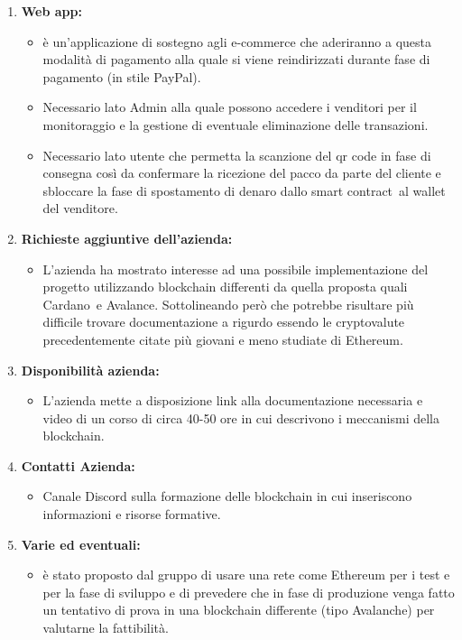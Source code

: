 \begin{enumerate}
	\item \textbf{Web app:}
	\begin{itemize}
		\item è un'applicazione di sostegno agli e-commerce che aderiranno a questa modalità di pagamento alla quale si viene reindirizzati durante fase di pagamento (in stile PayPal).
		\item Necessario lato Admin alla quale possono accedere i venditori per il monitoraggio e la gestione di eventuale eliminazione delle transazioni. 
		\item Necessario lato utente che permetta la scanzione del qr code in fase di consegna così da confermare la ricezione del pacco da parte del cliente e sbloccare la fase di spostamento di denaro dallo smart contract\glo\ al wallet del venditore.
	\end{itemize}

	\item \textbf{Richieste aggiuntive dell'azienda:}
	\begin{itemize}
		\item L'azienda ha mostrato interesse ad una possibile implementazione del progetto utilizzando blockchain\glo{} differenti da quella proposta quali Cardano\glo\ e Avalance\glo.
		 Sottolineando però che potrebbe risultare più difficile trovare documentazione a rigurdo essendo le cryptovalute precedentemente citate più giovani e meno studiate di Ethereum\glo.
	\end{itemize}

	\item \textbf{Disponibilità azienda:}
	\begin{itemize}
		\item L'azienda mette a disposizione link alla documentazione necessaria e video di un corso di circa 40-50 ore in cui descrivono i meccanismi della blockchain\glo{}.
		
	\end{itemize}

	\item \textbf{Contatti Azienda:}
	\begin{itemize}
		\item Canale Discord sulla formazione delle blockchain\glo{} in cui inseriscono informazioni e risorse formative.
	\end{itemize}

	\item \textbf{Varie ed eventuali:}
	\begin{itemize}
		\item è stato proposto dal gruppo di usare una rete come Ethereum per i test e per la fase di sviluppo e di prevedere che in fase di produzione venga fatto un tentativo di prova in una blockchain\glo{} differente (tipo Avalanche) per valutarne la fattibilità.
	\end{itemize}

\end{enumerate}

